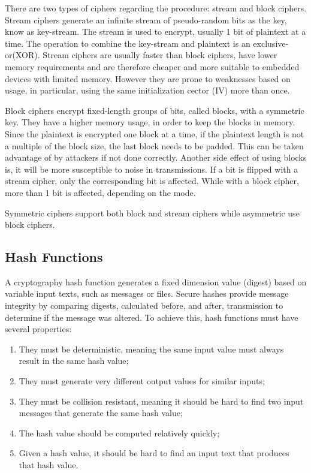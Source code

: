 There are two types of ciphers regarding the procedure: stream and block ciphers.
Stream ciphers generate an infinite stream of pseudo-random bits as the key, know as key-stream. The stream is used to encrypt, usually 1 bit of plaintext at a time. The operation to combine the key-stream and plaintext is an exclusive-or(XOR). Stream ciphers are usually faster than block ciphers, have lower memory requirements and are therefore cheaper and more suitable to embedded devices with limited memory. However they are prone to weaknesses based on usage, in particular, using the same initialization cector (IV) more than once. 

Block ciphers encrypt fixed-length groups of bits, called blocks, with a symmetric key. They have a higher memory usage, in order to keep the blocks in memory. Since the plaintext is encrypted one block at a time, if the plaintext length is not a multiple of the block size, the last block needs to be padded. This can be taken advantage of by attackers if not done correctly. Another side effect of using blocks is, it will be more susceptible to noise in transmissions. If a bit is flipped with a stream cipher, only the corresponding bit is affected. While with a block cipher, more than 1 bit is affected, depending on the mode.

Symmetric ciphers support both block and stream ciphers while asymmetric use block ciphers.

\subsection{Hash Functions}  \label{chap:background:crypto:hash}

A cryptography hash function generates a fixed dimension value (digest) based on variable input texts, such as messages or files. Secure hashes provide message integrity by comparing digests, calculated before, and after, transmission to determine if the message was altered. To achieve this, hash functions must have several properties:
\begin{enumerate}
    \item They must be deterministic, meaning the same input value must always result in the same hash value;
    \item They must generate very different output values for similar inputs;
    \item They must be collision resistant, meaning it should be hard to find two input messages that generate the same hash value;
    \item The hash value should be computed relatively quickly;
    \item Given a hash value, it should be hard to find an input text that produces that hash value.
\end{enumerate}


